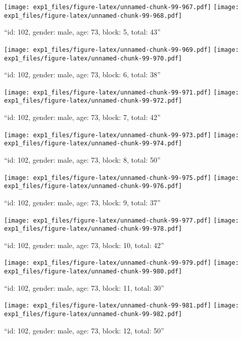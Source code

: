 \documentclass[,]{article}
\begin{document}
\texttt{[image: exp1\_files/figure-latex/unnamed-chunk-99-967.pdf]}
\texttt{[image: exp1\_files/figure-latex/unnamed-chunk-99-968.pdf]}

\newpage
[1] 

``id: 102, gender: male, age: 73, block: 5, total: 43''

\texttt{[image: exp1\_files/figure-latex/unnamed-chunk-99-969.pdf]}
\texttt{[image: exp1\_files/figure-latex/unnamed-chunk-99-970.pdf]}

\newpage
[1] 

``id: 102, gender: male, age: 73, block: 6, total: 38''

\texttt{[image: exp1\_files/figure-latex/unnamed-chunk-99-971.pdf]}
\texttt{[image: exp1\_files/figure-latex/unnamed-chunk-99-972.pdf]}

\newpage
[1] 

``id: 102, gender: male, age: 73, block: 7, total: 42''

\texttt{[image: exp1\_files/figure-latex/unnamed-chunk-99-973.pdf]}
\texttt{[image: exp1\_files/figure-latex/unnamed-chunk-99-974.pdf]}

\newpage
[1] 

``id: 102, gender: male, age: 73, block: 8, total: 50''

\texttt{[image: exp1\_files/figure-latex/unnamed-chunk-99-975.pdf]}
\texttt{[image: exp1\_files/figure-latex/unnamed-chunk-99-976.pdf]}

\newpage
[1] 

``id: 102, gender: male, age: 73, block: 9, total: 37''

\texttt{[image: exp1\_files/figure-latex/unnamed-chunk-99-977.pdf]}
\texttt{[image: exp1\_files/figure-latex/unnamed-chunk-99-978.pdf]}

\newpage
[1] 

``id: 102, gender: male, age: 73, block: 10, total: 42''

\texttt{[image: exp1\_files/figure-latex/unnamed-chunk-99-979.pdf]}
\texttt{[image: exp1\_files/figure-latex/unnamed-chunk-99-980.pdf]}

\newpage
[1] 

``id: 102, gender: male, age: 73, block: 11, total: 30''

\texttt{[image: exp1\_files/figure-latex/unnamed-chunk-99-981.pdf]}
\texttt{[image: exp1\_files/figure-latex/unnamed-chunk-99-982.pdf]}

\newpage
[1] 

``id: 102, gender: male, age: 73, block: 12, total: 50''
\end{document}
